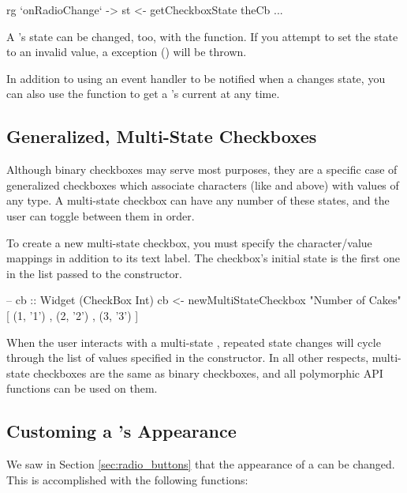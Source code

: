 \begin{haskellcode}
 rg `onRadioChange` \theCb ->
   st <- getCheckboxState theCb
   ...
\end{haskellcode}

A 's state can be changed, too, with the
 function.  If you attempt to set the state to an
invalid value, a  exception ()
will be thrown.

In addition to using an event handler to be notified when a
 changes state, you can also use the
 function to get a 's current
 at any time.

\subsection{Generalized, Multi-State Checkboxes}

Although binary checkboxes may serve most purposes, they are a
specific case of generalized checkboxes which associate characters
(like  and  above) with values of any type.  A
multi-state checkbox can have any number of these states, and the user
can toggle between them in order.

To create a new multi-state checkbox, you must specify the
character/value mappings in addition to its text label.  The
checkbox's initial state is the first one in the list passed to the
constructor.

\begin{haskellcode}
 -- cb :: Widget (CheckBox Int)
 cb <- newMultiStateCheckbox "Number of Cakes" [ (1, '1')
                                               , (2, '2')
                                               , (3, '3')
                                               ]
\end{haskellcode}

When the user interacts with a multi-state , repeated
state changes will cycle through the list of values specified in the
constructor.  In all other respects, multi-state checkboxes are the
same as binary checkboxes, and all polymorphic API functions can be
used on them.

\subsection{Customing a 's Appearance}

We saw in Section \ref{sec:radio_buttons} that the appearance of a
 can be changed.  This is accomplished with the following
functions:

